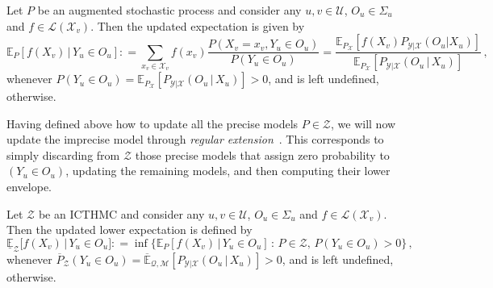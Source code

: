 \documentclass[twoside,11pt]{article}
\newcommand{\states}{\mathcal{X}}
\newcommand{\observs}{\mathcal{Y}}
\newcommand{\uexp}{\overline{\mathbb{E}}_{\rateset,\mathcal{M}}}
\newcommand{\gambles}{\mathcal{L}}
\newcommand{\rateset}{\mathcal{Q}}
\newcommand{\coloneqq}{:\!=}
\begin{document}
\begin{proposition}\label{prop:precise_conditioning_for_positive}
Let $P$ be an augmented stochastic process and consider any $u,v\in\mathcal{U}$, $O_u\in\Sigma_u$ and $f\in\gambles(\states_v)$. Then the updated expectation is given by
\begin{equation*}
\mathbb{E}_P[f(X_v)\,\vert\,Y_u\in O_u] \coloneqq \sum_{x_v\in\states_v}f(x_v)\frac{P(X_v=x_v, Y_u\in O_u)}{P(Y_u\in O_u)} = \frac{\mathbb{E}_{P_\states}[f(X_v)P_{\observs\vert\states}(O_u\vert X_u)]}{\mathbb{E}_{P_\states}[P_{\observs\vert\states}(O_u\,\vert\,X_u)]}\,,
\end{equation*}
whenever $P(Y_u\in O_u)=\mathbb{E}_{P_\states}[P_{\observs\vert\states}(O_u\,\vert\,X_u)]>0$, and is left undefined, otherwise.
\end{proposition}

Having defined above how to update all the precise models $P\in\mathcal{Z}$, we will now update the imprecise model through \emph{regular extension}~\citep{Walley:1991vk}. This corresponds to simply discarding from $\mathcal{Z}$ those precise models that assign zero probability to $(Y_u\in O_u)$, updating the remaining models, and then computing their lower envelope.%

\begin{definition}\label{def:reg_ext_pos}
Let $\mathcal{Z}$ be an ICTHMC and consider any $u,v\in\mathcal{U}$, $O_u\in\Sigma_u$ and $f\in\gambles(\states_v)$. Then the updated lower expectation is defined by
\begin{equation*}
\underline{\mathbb{E}}_{\mathcal{Z}}\bigl[f(X_v)\,\vert\,Y_u\in O_u\bigr] \coloneqq \inf\bigl\{ \mathbb{E}_P[f(X_v)\,\vert\,Y_u\in O_u]\,:\, P\in\mathcal{Z},\, P(Y_u\in O_u)>0 \bigr\}\,,
\end{equation*}
whenever $\overline{P}_\mathcal{Z}(Y_u\in O_u)=\uexp[P_{\observs\vert\states}(O_u\,\vert\,X_u)]>0$, and is left undefined, otherwise.
%
\end{definition}
\end{document}
